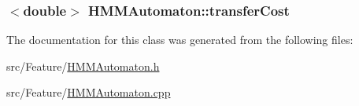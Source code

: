 \hypertarget{class_h_m_m_automaton_af2b7d9675b77191e808e8a0501313f69}{
\subsubsection[{transfer\+Cost}]{$<$double$>$ H\+M\+M\+Automaton\+::transfer\+Cost\hspace{0.3cm}{\ttfamily [protected]}}}\label{class_h_m_m_automaton_af2b7d9675b77191e808e8a0501313f69}


The documentation for this class was generated from the following files\+:\begin{DoxyCompactItemize}
\item 
src/\+Feature/\hyperlink{_h_m_m_automaton_8h}{H\+M\+M\+Automaton.\+h}\item 
src/\+Feature/\hyperlink{_h_m_m_automaton_8cpp}{H\+M\+M\+Automaton.\+cpp}\end{DoxyCompactItemize}
